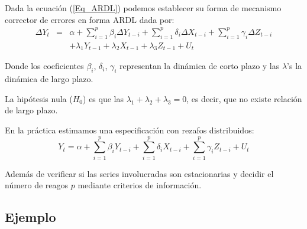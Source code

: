 \documentclass[
  a4paper,
]{article}
\begin{document}
Dada la ecuación (\ref{Eq_ARDL}) podemos establecer su forma de
mecanismo corrector de errores en forma ARDL dada por: \begin{eqnarray*}
    \Delta Y_t & = & \alpha + \sum_{i = 1}^p \beta_i \Delta Y_{t-i} + \sum_{i = 1}^p \delta_i \Delta X_{t-i} + \sum_{i = 1}^p \gamma_i \Delta Z_{t-i} \\ 
    &  & + \lambda_1 Y_{t-1} + \lambda_2 X_{t-1} + \lambda_3 Z_{t-1} + U_t
\end{eqnarray*}

Donde los coeficientes \(\beta_i\), \(\delta_i\), \(\gamma_i\)
representan la dinámica de corto plazo y las \(\lambda\)'s la dinámica
de largo plazo.

La hipótesis nula (\(H_0\)) es que las
\(\lambda_1 + \lambda_2 + \lambda_3 = 0\), es decir, que no existe
relación de largo plazo.

En la práctica estimamos una especificación con rezafos distribuidos: \[
    Y_t = \alpha + \sum_{i = 1}^p \beta_i Y_{t-i} + \sum_{i = 1}^p \delta_i X_{t-i} + \sum_{i = 1}^p \gamma_i Z_{t-i} + U_t
\]

Además de verificar si las series involucradas son estacionarias y
decidir el número de reagos \(p\) mediante criterios de información.

\hypertarget{ejemplo}{%
\subsection{Ejemplo}\label{ejemplo}}


\printbibliography
\end{document}
